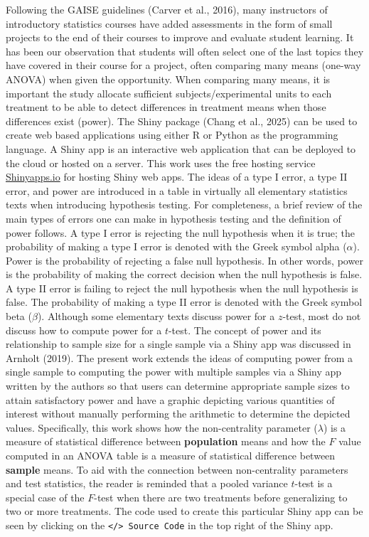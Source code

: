\documentclass[
]{article}
\begin{document}
Following the GAISE guidelines (Carver et al., 2016), many instructors of introductory statistics courses have added assessments in the form of small projects to the end of their courses to improve and evaluate student learning. It has been our observation that students will often select one of the last topics they have covered in their course for a project, often comparing many means (one-way ANOVA) when given the opportunity. When comparing many means, it is important the study allocate sufficient subjects/experimental units to each treatment to be able to detect differences in treatment means when those differences exist (power). The Shiny package (Chang et al., 2025) can be used to create web based applications using either R or Python as the programming language. A Shiny app is an interactive web application that can be deployed to the cloud or hosted on a server. This work uses the free hosting service \href{https://www.shinyapps.io/}{Shinyapps.io} for hosting Shiny web apps. The ideas of a type I error, a type II error, and power are introduced in a table in virtually all elementary statistics texts when introducing hypothesis testing. For completeness, a brief review of the main types of errors one can make in hypothesis testing and the definition of power follows. A type I error is rejecting the null hypothesis when it is true; the probability of making a type I error is denoted with the Greek symbol alpha (\(\alpha\)). Power is the probability of rejecting a false null hypothesis. In other words, power is the probability of making the correct decision when the null hypothesis is false. A type II error is failing to reject the null hypothesis when the null hypothesis is false. The probability of making a type II error is denoted with the Greek symbol beta (\(\beta\)). Although some elementary texts discuss power for a \(z\)-test, most do not discuss how to compute power for a \(t\)-test. The concept of power and its relationship to sample size for a single sample via a Shiny app was discussed in Arnholt (2019). The present work extends the ideas of computing power from a single sample to computing the power with multiple samples via a Shiny app written by the authors so that users can determine appropriate sample sizes to attain satisfactory power and have a graphic depicting various quantities of interest without manually performing the arithmetic to determine the depicted values. Specifically, this work shows how the non-centrality parameter (\(\lambda\)) is a measure of statistical difference between \textbf{population} means and how the \(F\) value computed in an ANOVA table is a measure of statistical difference between \textbf{sample} means. To aid with the connection between non-centrality parameters and test statistics, the reader is reminded that a pooled variance \(t\)-test is a special case of the \(F\)-test when there are two treatments before generalizing to two or more treatments. The code used to create this particular Shiny app can be seen by clicking on the \texttt{\textless{}/\textgreater{}\ Source\ Code} in the top right of the Shiny app.
\end{document}
